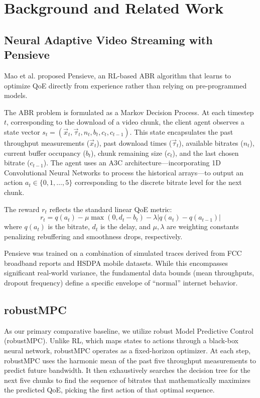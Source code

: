 \documentclass[10pt, conference, compsocconf]{IEEEtran}
\begin{document}
\section{Background and Related Work}

\subsection{Neural Adaptive Video Streaming with Pensieve}

Mao et al. \cite{mao2017neural} proposed Pensieve, an RL-based ABR algorithm that learns to optimize QoE directly from experience rather than relying on pre-programmed models.

The ABR problem is formulated as a Markov Decision Process. At each timestep $t$, corresponding to the download of a video chunk, the client agent observes a state vector $s_t = (\vec{x}_t, \vec{\tau}_t, n_t, b_t, c_t, c_{t-1})$. This state encapsulates the past throughput measurements ($\vec{x}_t$), past download times ($\vec{\tau}_t$), available bitrates ($n_t$), current buffer occupancy ($b_t$), chunk remaining size ($c_t$), and the last chosen bitrate ($c_{t-1}$). The agent uses an A3C architecture—incorporating 1D Convolutional Neural Networks to process the historical arrays—to output an action $a_t \in \{0, 1, \dots, 5\}$ corresponding to the discrete bitrate level for the next chunk.

The reward $r_t$ reflects the standard linear QoE metric:
\begin{equation}
    r_t = q(a_t) - \mu \max(0, d_t - b_t) - \lambda |q(a_t) - q(a_{t-1})|
\end{equation}
where $q(a_t)$ is the bitrate, $d_t$ is the delay, and $\mu, \lambda$ are weighting constants penalizing rebuffering and smoothness drops, respectively.

Pensieve was trained on a combination of simulated traces derived from FCC broadband reports and HSDPA mobile datasets. While this encompasses significant real-world variance, the fundamental data bounds (mean throughputs, dropout frequency) define a specific envelope of ``normal'' internet behavior.

\subsection{robustMPC}

As our primary comparative baseline, we utilize robust Model Predictive Control (robustMPC). Unlike RL, which maps states to actions through a black-box neural network, robustMPC operates as a fixed-horizon optimizer. At each step, robustMPC uses the harmonic mean of the past five throughput measurements to predict future bandwidth. It then exhaustively searches the decision tree for the next five chunks to find the sequence of bitrates that mathematically maximizes the predicted QoE, picking the first action of that optimal sequence.
\end{document}
